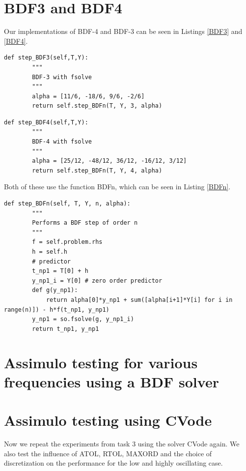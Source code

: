 \documentclass[a4paper,11pt]{article}
\theoremstyle{mytheor}
\begin{document}
\section{BDF3 and BDF4}
Our implementations of BDF-4 and BDF-3 can be seen in Listings \ref{BDF3} and \ref{BDF4}.

\begin{lstlisting}[caption = Python implementation of BDF3, label = BDF3]
    def step_BDF3(self,T,Y):
        """
        BDF-3 with fsolve
        """
        alpha = [11/6, -18/6, 9/6, -2/6]
        return self.step_BDFn(T, Y, 3, alpha)
\end{lstlisting}

\begin{lstlisting}[caption = Python implementation of BDF4, label = BDF4]
    def step_BDF4(self,T,Y):
        """
        BDF-4 with fsolve
        """
        alpha = [25/12, -48/12, 36/12, -16/12, 3/12]
        return self.step_BDFn(T, Y, 4, alpha)
\end{lstlisting}

Both of these use the function BDFn, which can be seen in Listing \ref{BDFn}.

\begin{lstlisting}[caption = Auxiliary function BDFn, label = BDFn]
    def step_BDFn(self, T, Y, n, alpha):
        """
        Performs a BDF step of order n
        """
        f = self.problem.rhs
        h = self.h
        # predictor
        t_np1 = T[0] + h
        y_np1_i = Y[0] # zero order predictor
        def g(y_np1):
            return alpha[0]*y_np1 + sum([alpha[i+1]*Y[i] for i in range(n)]) - h*f(t_np1, y_np1)
        y_np1 = so.fsolve(g, y_np1_i)
        return t_np1, y_np1
\end{lstlisting}

\section{Assimulo testing for various frequencies using a BDF solver}

\section{Assimulo testing using CVode}
Now we repeat the experiments from task 3 using the solver CVode again. We also test the influence of ATOL, RTOL, MAXORD and the choice of discretization on the performance for the low and highly oscillating case.
\end{document}
